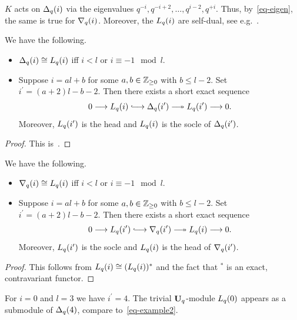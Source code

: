 $K$ acts on $\Delta_q({i})$ via the eigenvalues $q^{-i},q^{-i+2},\dots,q^{i-2},q^{+i}$. 
Thus, by~\eqref{eq-eigen}, the same is 
true for $\nabla_q({i})$. Moreover, the 
$L_q({i})$ are self-dual, see e.g.~\cite[Section~4]{apw}.




\begin{prop}\label{prop-weyl}
We have the following.
\begin{itemize}
\item[(a)] $\Delta_q({i})\cong L_q({i})$ iff $i<l$ or $i\equiv -1\mod l$.
\item[(b)] Suppose $i=al+b$ for 
some $a,b\in\mathbb{Z}_{\geq 0}$ with $b\leq l-2$. 
Set $i^{\prime}=(a+2)l-b-2$. Then there exists a short exact sequence
\[
0\longrightarrow \Ln i\hooklongrightarrow\Vn{i^{\prime}}\twoheadlongrightarrow \Ln{i^{\prime}}\longrightarrow 0.
\]
Moreover, $L_q({i^{\prime}})$ is the 
head and $L_q({i})$ is the socle of $\Delta_q({i^{\prime}})$.\makeqed
\end{itemize}
\end{prop}


\begin{proof}
This is~\cite[Corollary~4.6]{apw}.
\end{proof} 
\begin{cor}\label{cor-weyl}
We have the following.
\begin{itemize}
\item[(a)] $\nabla_q({i})\cong L_q({i})$ iff $i<l$ or $i\equiv -1\mod l$.
\item[(b)] Suppose $i=al+b$ for some 
$a,b\in\mathbb{Z}_{\geq 0}$ with $b\leq l-2$. Set $i^{\prime}=(a+2)l-b-2$. 
Then there exists a short exact sequence
\[
0\longrightarrow L_q(i^{\prime})\hooklongrightarrow\nabla_q(i^{\prime})\twoheadlongrightarrow \Ln i\longrightarrow 0.
\]
Moreover, $L_q({i^{\prime}})$ is the socle and 
$L_q({i})$ is the head of $\nabla_q({i^{\prime}})$.\makeqed
\end{itemize}
\end{cor}



\begin{proof}
This follows from $L_q({i})\cong(L_q({i}))^*$ and 
the fact that ${}^*$ is an exact, contravariant functor.
\end{proof}



\begin{ex}\label{ex-weyl2}
For $i=0$ and $l=3$ we have $i^{\prime}=4$. 
The trivial $\boldsymbol{\mathrm{U}}_q$-module $L_q({0})$ appears as a 
submodule of $\Delta_q({4})$, compare to~\eqref{eq-example2}.
\end{ex}



